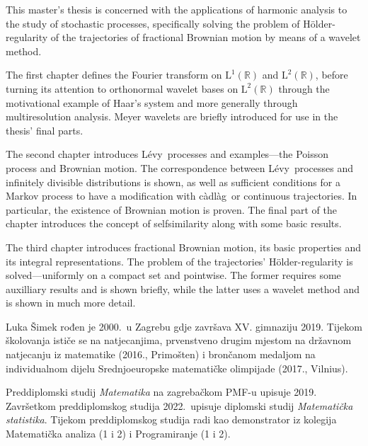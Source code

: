 \documentclass[a4paper,oneside,12pt]{memoir}
\numberwithin{teorem}{section}
\numberwithin{equation}{chapter}
\numberwithin{figure}{chapter}
\numberwithin{table}{chapter}
\newcommand{\R}{\mathbb{R}}
\newcommand{\holder}{H\" older}
\newcommand{\cadlag}{c\` adl\` ag}
\newcommand{\levy}{L\' evy}
\def\L{\mathrm{L}}
\begin{document}
\begin{summary}
	This master's thesis is concerned with the applications of harmonic analysis to the study
	of stochastic processes, specifically solving the problem of \holder -regularity of the trajectories
	of fractional Brownian motion by means of a wavelet method.

	The first chapter defines the Fourier transform on \( \L^1(\R) \) and
	\( \L^2(\R) \), before turning its attention to orthonormal wavelet bases
	on \( \L^2(\R) \) through the motivational example of Haar's system and
	more generally through multiresolution analysis. Meyer wavelets are briefly introduced
	for use in the thesis' final parts.

	The second chapter introduces \levy \ processes and examples---the Poisson process and
	Brownian motion. The correspondence between \levy \ processes and infinitely divisible
	distributions is shown, as well as sufficient conditions for a Markov process to have a
	modification with \cadlag \ or continuous trajectories. In particular, the existence of
	Brownian motion is proven. The final part of the chapter introduces
	the concept of selfsimilarity along with some basic results.

	The third chapter introduces fractional Brownian motion, its basic properties and
	its integral representations. The problem of the trajectories' \holder -regularity
	is solved---uniformly on a compact set and pointwise. The former
	requires some auxilliary results and is shown briefly, while the latter
	uses a wavelet method and is shown in much more detail.
\end{summary}

\begin{cv}
	Luka Šimek rođen je 2000.\ u Zagrebu gdje završava XV. gimnaziju 2019. Tijekom školovanja ističe se na natjecanjima, prvenstveno drugim mjestom na državnom natjecanju iz matematike (2016., Primošten) i brončanom medaljom na individualnom dijelu Srednjoeuropske matematičke olimpijade (2017., Vilnius).

	Preddiplomski studij \emph{Matematika} na zagrebačkom PMF-u upisuje 2019. Završetkom preddiplomskog studija 2022.\ upisuje diplomski studij \emph{Matematička statistika}.
	Tijekom preddiplomskog studija radi kao demonstrator iz kolegija Matematička analiza (1 i 2) i Programiranje (1 i 2).
\end{cv}
\end{document}
